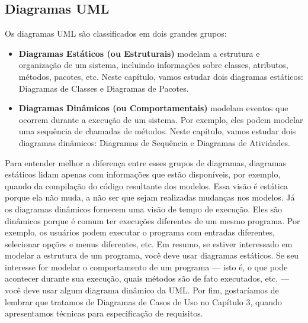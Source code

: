 \documentclass[
  11pt,
  twoside]{book}
\begin{document}
\hypertarget{diagramas-uml}{%
\subsection*{Diagramas UML}\label{diagramas-uml}}

 

Os diagramas UML são classificados em dois grandes grupos:

\begin{itemize}
\item
  \textbf{Diagramas Estáticos (ou Estruturais)} modelam a estrutura e
  organização de um sistema, incluindo informações sobre classes,
  atributos, métodos, pacotes, etc. Neste capítulo, vamos estudar dois
  diagramas estáticos: Diagramas de Classes e Diagramas de Pacotes.
\item
  \textbf{Diagramas Dinâmicos (ou Comportamentais)} modelam eventos que
  ocorrem durante a execução de um sistema. Por exemplo, eles podem
  modelar uma sequência de chamadas de métodos. Neste capítulo, vamos
  estudar dois diagramas dinâmicos: Diagramas de Sequência e Diagramas
  de Atividades.
\end{itemize}

Para entender melhor a diferença entre esses grupos de diagramas,
diagramas estáticos lidam apenas com informações que estão disponíveis,
por exemplo, quando da compilação do código resultante dos modelos. Essa
visão é estática porque ela não muda, a não ser que sejam realizadas
mudanças nos modelos. Já os diagramas dinâmicos fornecem uma visão de
tempo de execução. Eles são dinâmicos porque é comum ter execuções
diferentes de um mesmo programa. Por exemplo, os usuários podem executar
o programa com entradas diferentes, selecionar opções e menus
diferentes, etc. Em resumo, se estiver interessado em modelar a
estrutura de um programa, você deve usar diagramas estáticos. Se seu
interesse for modelar o comportamento de um programa --- isto é, o que
pode acontecer durante sua execução, quais métodos são de fato
executados, etc. --- você deve usar algum diagrama dinâmico da UML. Por
fim, gostaríamos de lembrar que tratamos de Diagramas de Casos de Uso no
Capítulo 3, quando apresentamos técnicas para especificação de
requisitos.
\end{document}
